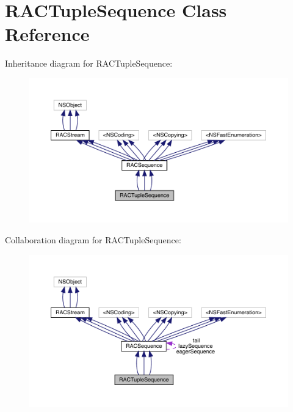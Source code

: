 \hypertarget{interface_r_a_c_tuple_sequence}{}\section{R\+A\+C\+Tuple\+Sequence Class Reference}
\label{interface_r_a_c_tuple_sequence}


Inheritance diagram for R\+A\+C\+Tuple\+Sequence\+:\nopagebreak
\begin{figure}[H]
\begin{center}
\leavevmode
\includegraphics[width=350pt]{interface_r_a_c_tuple_sequence__inherit__graph}
\end{center}
\end{figure}


Collaboration diagram for R\+A\+C\+Tuple\+Sequence\+:\nopagebreak
\begin{figure}[H]
\begin{center}
\leavevmode
\includegraphics[width=350pt]{interface_r_a_c_tuple_sequence__coll__graph}
\end{center}
\end{figure}
